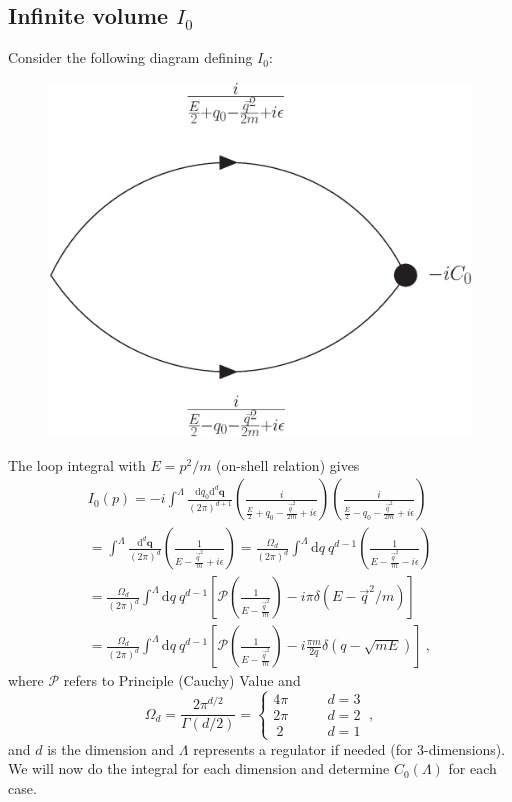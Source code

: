 \documentclass[11pt]{article}
\begin{document}
\subsection{Infinite volume $I_0$}
Consider the following diagram defining $I_0$:
\begin{figure}[h!]
\center
\includegraphics[width=.5\columnwidth]{figure/I0.eps}
\caption{\label{fig:I0}}
\end{figure}

\noindent The loop integral with $E=p^2/m$ (on-shell relation) gives
\begin{multline}\label{eqn:I0 general}
I_0(p)=-i\int^\Lambda \frac { \mathrm {d}q_0 \mathrm { d } ^ { d } \mathbf { q } } { ( 2 \pi ) ^ { d+1 } } \left( \frac { i } { \frac{E}{2} + q _ { 0 } - \frac{\vec{q}^2}{2m} + i \epsilon } \right) \left( \frac { i } { \frac{E}{2} - q _ { 0 } - \frac{\vec{q}^2}{2m} + i \epsilon } \right)\\
=\int^\Lambda \frac { \mathrm { d } ^ { d  } \mathbf { q } } { ( 2 \pi ) ^ { d } } \left( \frac { 1 } { E - \frac{\vec{q}^2}{m} + i \epsilon } \right)
=\frac{\Omega_d}{(2\pi)^d}\int^\Lambda  \mathrm { d } q \ q^{d-1} \left( \frac { 1 } { E - \frac{\vec{q}^2}{m} - i \epsilon } \right)\\
=\frac{\Omega_d}{(2\pi)^d}\int^\Lambda  \mathrm { d } q \ q^{d-1}\left[\mathcal{P} \left( \frac { 1 } { E - \frac{\vec{q}^2}{m} } \right)
-i\pi\delta(E-\vec{q}^2/m)\right]\\
=\frac{\Omega_d}{(2\pi)^d}\int^\Lambda  \mathrm { d } q \ q^{d-1}\left[\mathcal{P} \left( \frac { 1 } { E - \frac{\vec{q}^2}{m} } \right)
-i\frac{\pi m}{2q}\delta(q-\sqrt{mE})\right]
\ ,
\end{multline}
where $\mathcal{P}$ refers to Principle (Cauchy) Value and
\begin{equation}
\Omega_d=\frac{2\pi^{d/2}}{\Gamma(d/2)}=
\begin{cases}
4\pi&\quad\quad d=3\\
2\pi&\quad\quad d=2\\
\ 2\ &\quad\quad d=1
\end{cases}\ ,
\end{equation}
and $d$ is the dimension and $\Lambda$ represents a regulator if needed (for 3-dimensions).  We will now do the integral for each dimension and determine $C_0(\Lambda)$ for each case.
\end{document}

